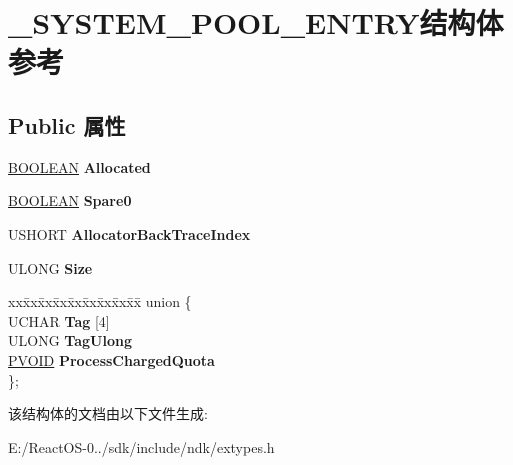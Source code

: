 \hypertarget{struct___s_y_s_t_e_m___p_o_o_l___e_n_t_r_y}{}\section{\+\_\+\+S\+Y\+S\+T\+E\+M\+\_\+\+P\+O\+O\+L\+\_\+\+E\+N\+T\+R\+Y结构体 参考}
\label{struct___s_y_s_t_e_m___p_o_o_l___e_n_t_r_y}
\subsection*{Public 属性}
\begin{DoxyCompactItemize}
\item 
\mbox{\label{struct___s_y_s_t_e_m___p_o_o_l___e_n_t_r_y_a90f083f17e56c13b9e8080dd16407168}} 
\hyperlink{_processor_bind_8h_a112e3146cb38b6ee95e64d85842e380a}{B\+O\+O\+L\+E\+AN} {\bfseries Allocated}
\item 
\mbox{\label{struct___s_y_s_t_e_m___p_o_o_l___e_n_t_r_y_abef89dd9741b0521125173bf3e5fe1de}} 
\hyperlink{_processor_bind_8h_a112e3146cb38b6ee95e64d85842e380a}{B\+O\+O\+L\+E\+AN} {\bfseries Spare0}
\item 
\mbox{\label{struct___s_y_s_t_e_m___p_o_o_l___e_n_t_r_y_a3589d5e223794e0c4c0ddf54c5bfeebb}} 
U\+S\+H\+O\+RT {\bfseries Allocator\+Back\+Trace\+Index}
\item 
\mbox{\label{struct___s_y_s_t_e_m___p_o_o_l___e_n_t_r_y_aeba9ce4ee23520eafdc49a122d9c518b}} 
U\+L\+O\+NG {\bfseries Size}
\item 
\mbox{\label{struct___s_y_s_t_e_m___p_o_o_l___e_n_t_r_y_ae79af71c9c4f998821a2af19a7584f00}} 
\begin{tabbing}
xx\=xx\=xx\=xx\=xx\=xx\=xx\=xx\=xx\=\kill
union \{\\
\>UCHAR {\bfseries Tag} \mbox{[}4\mbox{]}\\
\>ULONG {\bfseries TagUlong}\\
\>\hyperlink{interfacevoid}{PVOID} {\bfseries ProcessChargedQuota}\\
\}; \\

\end{tabbing}\end{DoxyCompactItemize}


该结构体的文档由以下文件生成\+:\begin{DoxyCompactItemize}
\item 
E\+:/\+React\+O\+S-\/0../sdk/include/ndk/extypes.\+h\end{DoxyCompactItemize}
